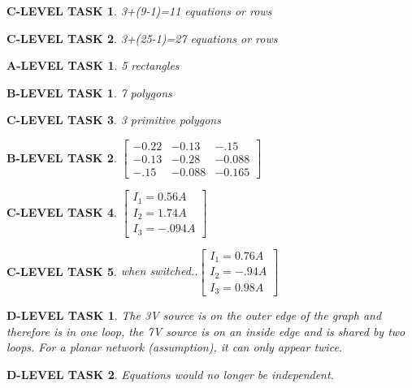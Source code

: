\documentclass{book}
\numberwithin{equation}{section}
\newtheorem{alevel}{A-LEVEL TASK}
\newtheorem{blevel}{B-LEVEL TASK}
\newtheorem{clevel}{C-LEVEL TASK}
\newtheorem{dlevel}{D-LEVEL TASK}
\theoremstyle{definition}
\begin{document}
\begin{clevel} 3+(9-1)=11 equations or rows\end{clevel}
\begin{clevel} 3+(25-1)=27 equations or rows\end{clevel}

\begin{alevel} 5 rectangles\end{alevel}
\begin{blevel} 7 polygons\end{blevel}
\begin{clevel} 3 primitive polygons \end{clevel}

\begin{blevel} $\left[ \begin{matrix}-0.22&-0.13&-.15\\-0.13&-0.28&-0.088\\-.15&-0.088&-0.165 \end{matrix}\right]$ \end{blevel}
\begin{clevel} $\left[ \begin{matrix}I_1=0.56A\\I_2=1.74A\\I_3=-.094A \end{matrix}\right]$ \end{clevel}
\begin{clevel} when switched..$\left[ \begin{matrix}I_1=0.76A\\I_2=-.94A\\I_3=0.98A \end{matrix}\right]$ \end{clevel}
\begin{dlevel} The 3V source is on the outer edge of the graph and therefore is in one loop, the 7V source is on an inside edge and is shared by two loops. For a planar network (assumption), it can only appear twice.\end{dlevel}
\begin{dlevel} Equations would no longer be independent.\end{dlevel}
\end{document}

